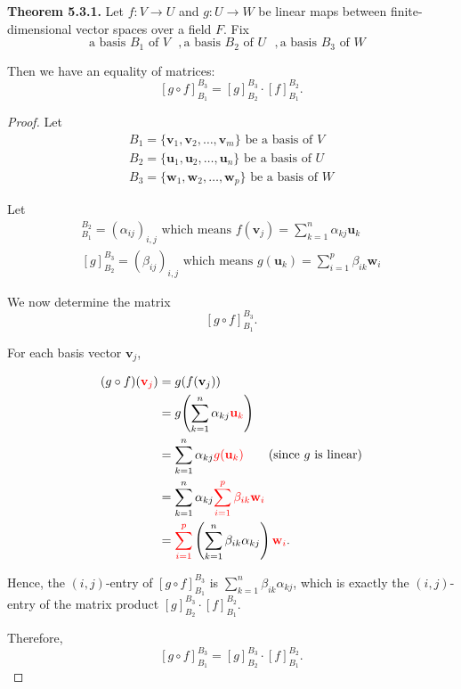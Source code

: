 \documentclass[12pt]{article}
\begin{document}
\textbf{Theorem 5.3.1.}
Let $f:V\to U$ and $g:U\to W$ be linear maps between finite-dimensional vector spaces over a field
$F$. Fix
\[
\text{a basis $B_1$ of $V$ },\text{a basis $B_2$ of $U$ },\text{a basis $B_3$ of $W$ }
\]

Then we have an equality of matrices:
\[
[g\circ f]_{B_1}^{B_3}=[g]_{B_2}^{B_3} \cdot [f]_{B_1}^{B_2}.
\]

\begin{proof}

Let
\begin{align*}
B_1=\{\mathbf{v}_1,\mathbf{v}_2,\ldots,\mathbf{v}_m\} \text{ be a basis of $V$}\\
B_2=\{\mathbf{u}_1,\mathbf{u}_2,\ldots,\mathbf{u}_n\} \text{ be a basis of $U$}\\
B_3=\{\mathbf{w}_1,\mathbf{w}_2,\ldots,\mathbf{w}_p\} \text{ be a basis of $W$}
\end{align*}

Let
\begin{align*}
[f]_{B_1}^{B_2}=(\alpha_{ij})_{i,j} \text{ which means } f(\mathbf{v}_j)=\sum_{k=1}^{n}\alpha_{kj}\mathbf{u}_k\\
[g]_{B_2}^{B_3}=(\beta_{ij})_{i,j} \text{ which means } g(\mathbf{u}_k)=\sum_{i=1}^{p}\beta_{ik}\mathbf{w}_i
\end{align*}

We now determine the matrix
\[
[g\circ f]_{B_1}^{B_3}.
\]

For each basis vector $\mathbf{v}_j$,

\begin{align*}
(g\circ f)(\textcolor{red}{\mathbf{v}_j})
&=
g\!\left(f(\mathbf{v}_j)\right)                                           \\
&=
g\!\left(
\sum_{k=1}^{n}\alpha_{kj}\textcolor{red}{\mathbf{u}_k}
\right)                                                                    \\
&=
\sum_{k=1}^{n}\alpha_{kj}\textcolor{red}{g(\mathbf{u}_k)}
\qquad
(\text{since }g\text{ is linear})                                          \\
&=
\sum_{k=1}^{n}\alpha_{kj}\textcolor{red}{\sum_{i=1}^{p}\beta_{ik}\mathbf{w}_i}                                      \\
&=
\textcolor{red}{\sum_{i=1}^{p}}
\left(
\sum_{k=1}^{n}\beta_{ik}\alpha_{kj}
\right)
\textcolor{red}{\mathbf{w}_i}.
\end{align*}

Hence, the $(i,j)$-entry of $[g\circ f]_{B_1}^{B_3}$ is $\sum_{k=1}^{n}\beta_{ik}\alpha_{kj}$,
which is exactly the $(i,j)$-entry of the matrix product $[g]_{B_2}^{B_3} \cdot[f]_{B_1}^{B_2}$.

Therefore,
\[
[g\circ f]_{B_1}^{B_3}=[g]_{B_2}^{B_3}\cdot[f]_{B_1}^{B_2}.
\]

\end{proof}
\end{document}
